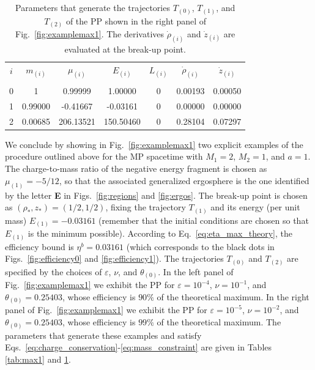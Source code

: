 \begin{table}[h]
  \centering
  \begin{tabular}{ccccccc}
    \hline\hline
    $i$ & $m_{(i)}$ & $\mu_{(i)}$ & $E_{(i)}$ & $L_{(i)}$ & $\dot{\rho}_{(i)}$ & $\dot{z}_{(i)}$ \\ \vspace{-0.3cm} \\
    0   & 1         & 0.99999     & 1.00000   & 0         & 0.00193            & 0.00050         \\
    1   & 0.99000   & -0.41667    & -0.03161  & 0         & 0.00000            & 0.00000         \\
    2   & 0.00685   & 206.13521   & 150.50460 & 0         & 0.28104            & 0.07297         \\
    \hline\hline
  \end{tabular}
  \caption{Parameters that generate the trajectories $T_{(0)}$, $T_{(1)}$, and $T_{(2)}$ of the \ac{PP} shown in the right panel of Fig.~\ref{fig:examplemax1}. The derivatives $\dot{\rho}_{(i)}$ and $\dot{z}_{(i)}$ are evaluated at the break-up point.
  }
  \label{tab:max2}
\end{table}

We conclude by showing in Fig.~\ref{fig:examplemax1} two explicit examples of the procedure outlined above for the \ac{MP} spacetime with $M_1=2$, $M_2=1$, and $a=1$. The charge-to-mass ratio of the negative energy fragment is chosen as $\mu_{(1)}=-5/12$, so that the associated generalized ergosphere is the one identified by the letter \textbf{E} in Figs.~\ref{fig:regions} and \ref{fig:ergos}. The  break-up point is chosen as $(\rho_*,z_*)=(1/2,1/2)$, fixing the trajectory $T_{(1)}$ and its energy (per unit mass) $E_{(1)}=-0.03161$ (remember that the initial conditions are chosen so that $E_{(1)}$ is the minimum possible). According to Eq.~\eqref{eq:eta_max_theory}, the efficiency bound is $\eta^{b} = 0.03161$ (which corresponds to the black dots in Figs.~\ref{fig:efficiency0} and \ref{fig:efficiency1}). The trajectories $T_{(0)}$ and $T_{(2)}$ are specified by the choices of $\varepsilon$, $\nu$, and $\theta_{(0)}$. In the left panel of Fig.~\ref{fig:examplemax1}  we exhibit the \ac{PP} for $\varepsilon=10^{-4}$, $\nu=10^{-1}$, and $\theta_{(0)}=0.25403$, whose efficiency is $90 \%$ of the theoretical maximum. In the right panel of Fig.~\ref{fig:examplemax1} we exhibit the \ac{PP} for $\varepsilon=10^{-5}$, $\nu=10^{-2}$, and $\theta_{(0)}=0.25403$, whose efficiency is $99 \%$ of the theoretical maximum. The parameters that generate these examples and satisfy Eqs.~\eqref{eq:charge_conservation}-\eqref{eq:mass_constraint} are  given in Tables \ref{tab:max1} and \ref{tab:max2}.